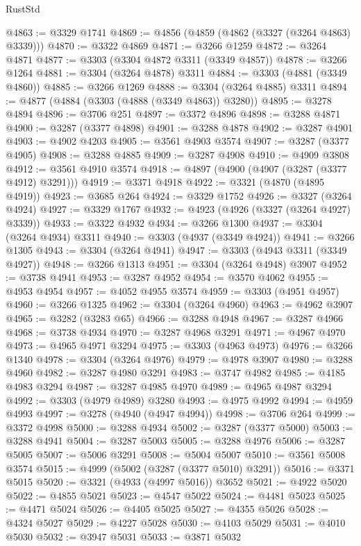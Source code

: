 \begin{lexlean}{RustStd}
\begin{coremodule}
{\begin{coremodule}
{{{{{{{{{{{{{{{{{{{{{{{{{{{{{{{{{@4863 := @3329 @1741
@4869 := @4856 (@4859 (@4862 (@3327 (@3264 @4863) @3339)))
@4870 := @3322 @4869
@4871 := @3266 @1259
@4872 := @3264 @4871
@4877 := @3303 (@3304 @4872 @3311 (@3349 @4857))
@4878 := @3266 @1264
@4881 := @3304 (@3264 @4878) @3311
@4884 := @3303 (@4881 (@3349 @4860))
@4885 := @3266 @1269
@4888 := @3304 (@3264 @4885) @3311
@4894 := @4877 (@4884 (@3303 (@4888 (@3349 @4863)) @3280))
@4895 := @3278 @4894
@4896 := @3706 @251
@4897 := @3372 @4896
@4898 := @3288 @4871
@4900 := @3287 (@3377 @4898)
@4901 := @3288 @4878
@4902 := @3287 @4901
@4903 := @4902 @4203
@4905 := @3561 @4903 @3574
@4907 := @3287 (@3377 @4905)
@4908 := @3288 @4885
@4909 := @3287 @4908
@4910 := @4909 @3808
@4912 := @3561 @4910 @3574
@4918 := @4897 (@4900 (@4907 (@3287 (@3377 @4912) @3291)))
@4919 := @3371 @4918
@4922 := @3321 (@4870 (@4895 @4919))
@4923 := @3685 @264
@4924 := @3329 @1752
@4926 := @3327 (@3264 @4924)
@4927 := @3329 @1767
@4932 := @4923 (@4926 (@3327 (@3264 @4927) @3339))
@4933 := @3322 @4932
@4934 := @3266 @1300
@4937 := @3304 (@3264 @4934) @3311
@4940 := @3303 (@4937 (@3349 @4924))
@4941 := @3266 @1305
@4943 := @3304 (@3264 @4941)
@4947 := @3303 (@4943 @3311 (@3349 @4927))
@4948 := @3266 @1313
@4951 := @3304 (@3264 @4948) @3907
@4952 := @3738 @4941
@4953 := @3287 @4952
@4954 := @3570 @4062
@4955 := @4953 @4954
@4957 := @4052 @4955 @3574
@4959 := @3303 (@4951 @4957)
@4960 := @3266 @1325
@4962 := @3304 (@3264 @4960)
@4963 := @4962 @3907
@4965 := @3282 (@3283 @65)
@4966 := @3288 @4948
@4967 := @3287 @4966
@4968 := @3738 @4934
@4970 := @3287 @4968 @3291
@4971 := @4967 @4970
@4973 := @4965 @4971 @3294
@4975 := @3303 (@4963 @4973)
@4976 := @3266 @1340
@4978 := @3304 (@3264 @4976)
@4979 := @4978 @3907
@4980 := @3288 @4960
@4982 := @3287 @4980 @3291
@4983 := @3747 @4982
@4985 := @4185 @4983 @3294
@4987 := @3287 @4985 @4970
@4989 := @4965 @4987 @3294
@4992 := @3303 (@4979 @4989) @3280
@4993 := @4975 @4992
@4994 := @4959 @4993
@4997 := @3278 (@4940 (@4947 @4994))
@4998 := @3706 @264
@4999 := @3372 @4998
@5000 := @3288 @4934
@5002 := @3287 (@3377 @5000)
@5003 := @3288 @4941
@5004 := @3287 @5003
@5005 := @3288 @4976
@5006 := @3287 @5005
@5007 := @5006 @3291
@5008 := @5004 @5007
@5010 := @3561 @5008 @3574
@5015 := @4999 (@5002 (@3287 (@3377 @5010) @3291))
@5016 := @3371 @5015
@5020 := @3321 (@4933 (@4997 @5016)) @3652
@5021 := @4922 @5020
@5022 := @4855 @5021
@5023 := @4547 @5022
@5024 := @4481 @5023
@5025 := @4471 @5024
@5026 := @4405 @5025
@5027 := @4355 @5026
@5028 := @4324 @5027
@5029 := @4227 @5028
@5030 := @4103 @5029
@5031 := @4010 @5030
@5032 := @3947 @5031
@5033 := @3871 @5032
}}}}}}}}}}}}}}}}}}}}}}}}}}}}}}}}}
\end{coremodule}}
\end{coremodule}
\end{lexlean}
